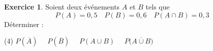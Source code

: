 \documentclass{exam}
\theoremstyle{definition}
\newtheorem{exercice}{Exercice}
\begin{document}
\begin{exercice}
Soient deux événements \(A\) et \(B\) tels que 
\[
P(A) = 0{,}5\quad P(B) = 0{,}6\quad P(A \cap B) = 0{,}3
\]
Déterminer :
\begin{tasks}[style=enumerate](4)
  \task $P(\overline{A})$
  \task $\quad P(\overline{B})$
  \task $\quad P(A \cup B)$
  \task $\quad P\bigl(\overline{A \cup B}\bigr)$
\end{tasks}

\begin{center}
\end{center}
\end{exercice}
\end{document}

